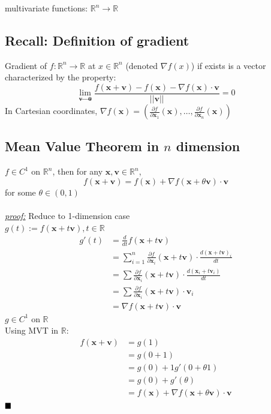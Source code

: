 \documentclass[11pt]{article}
\newcommand{\tb}[1]{\textbf{#1}}
\newcommand{\real}[0]{\mathbb{R}}
\newcommand{\proof}[0]{\textit{\underline{proof:} }}
\newcommand{\vx}[0]{\tb{x}}
\newcommand{\vo}[0]{\tb{0}}
\newcommand{\vv}[0]{\tb{v}}
\newcommand{\qed}[0]{$\hfill\blacksquare$}
\begin{document}
multivariate functions: $\real^n \rightarrow \real$
\subsection{Recall: Definition of gradient}
Gradient of $f: \real^n \rightarrow \real$ at $x \in \real^n$ (denoted $\nabla f(x)$) if exists is a vector characterized by the property:
$$\underset{\vv \rightarrow \vo}{\lim} \frac{f(\vx+\vv)-f(\vx) - \nabla f(\vx) \cdot \vv}{||\vv||} = 0$$
In Cartesian coordinates, $\nabla f(\vx) = (\frac{\partial f}{\partial \vx_1}(\vx), \hdots, \frac{\partial f}{\partial \vx_n}(\vx))$

\subsection{Mean Value Theorem in $n$ dimension}
$f \in C^1$ on $\real^n$, then for any $\vx, \vv \in \real^n$,
$$f(\vx + \vv) = f(\vx) + \nabla f(\vx+ \theta \vv) \cdot \vv$$
for some $\theta \in (0,1)$\\\\
\proof Reduce to 1-dimension case \\
$g(t) := f(\vx+t\vv), t \in \real$ \\
\begin{align*}
	g'(t) &= \frac{d}{dt}f(\vx+t\vv) \\
	&= \sum_{i=1}^n \frac{\partial f}{\partial \vx_i}(\vx + t\vv)\cdot \frac{d(\vx+t\vv)_i}{dt}
	\tag{by Chain Rule} \\
	&= \sum \frac{\partial f}{\partial \vx_i}(\vx + t\vv)\cdot \frac{d(\vx_i + t\vv_i)}{dt} \\
	&= \sum \frac{\partial f}{\partial \vx_i} (\vx + t\vv)\cdot \vv_i \\
	&= \nabla f(\vx + t\vv)\cdot \vv \tag{*}
\end{align*}
$g \in C^1$ on $\real$\\
Using MVT in $\real$:
\begin{align*}
f(\vx+\vv) &= g(1) \\
&= g(0+1) \\
&= g(0) + 1g'(0+\theta 1) \tag{$\theta \in (0,1)$}\\
&= g(0) + g'(\theta) \\
&= f(\vx) + \nabla f(\vx+\theta \vv) \cdot \vv \tag{by (*)}
\end{align*}
\qed
\end{document}

